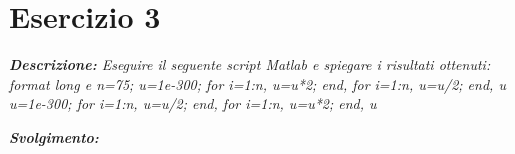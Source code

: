 \section{Esercizio 3}
\textit{\textbf{Descrizione:} Eseguire il seguente script Matlab e spiegare i risultati ottenuti:
\newline\newline		
format long e\newline
n=75;\newline
u=1e-300; for i=1:n, u=u*2; end, for i=1:n, u=u/2; end, u\newline
u=1e-300; for i=1:n, u=u/2; end, for i=1:n, u=u*2; end, u}\newline

\noindent \textit{\textbf{Svolgimento:}}\newline

